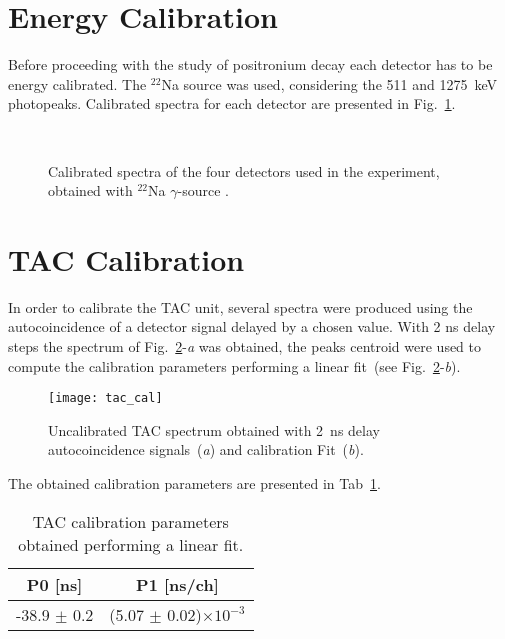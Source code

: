 \newpage
\section*{Energy Calibration}

Before proceeding with the study of positronium decay each detector has to be energy calibrated. The $^{22}$Na source was used, considering the 511 and  1275~keV photopeaks. Calibrated spectra for each detector are presented in Fig.~\ref{Fig:Calibrated_spectra}.

\begin{figure}[h!]
	\centering
	 \quad
		 \quad 
		 \quad
		 \\
	\caption{Calibrated spectra of the four detectors used in the experiment, obtained with $^{22}$Na $\gamma$-source .}
	\label{Fig:Calibrated_spectra}
\end{figure}

\section*{TAC Calibration}

In order to calibrate the TAC unit, several spectra were produced using the autocoincidence of a detector signal delayed by a chosen
value. With 2 ns delay steps the spectrum of Fig.~\ref{Fig:Tac_calibration}-\emph{a} was obtained, the peaks
centroid were used to compute the calibration parameters performing a linear fit~(see Fig.~\ref{Fig:Tac_calibration}-\emph{b}).

\begin{figure}[H]
\centering
\texttt{[image: tac\_cal]}
\caption{Uncalibrated TAC spectrum obtained with 2~ns delay autocoincidence signals~(\emph{a}) and calibration Fit~(\emph{b}).}
\label{Fig:Tac_calibration}
\end{figure}

The obtained calibration parameters are presented in Tab~\ref{Tab:Cal_par}.
\begin{table}[H]
\centering
\begin{tabular}{cc}
\toprule
P0 [ns] & P1 [ns/ch] \\
\midrule
-38.9 $\pm$ 0.2 & (5.07 $\pm$ 0.02)$\times 10^{-3}$\\
\bottomrule
\end{tabular}
\caption{TAC calibration parameters obtained performing a linear fit.}
\label{Tab:Cal_par}
\end{table}
